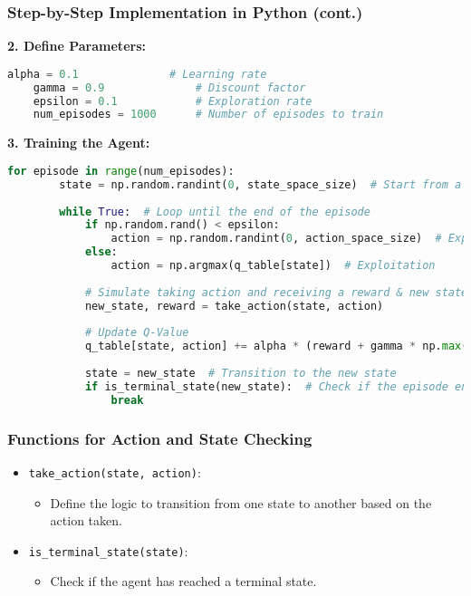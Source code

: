 \documentclass[aspectratio=169]{beamer}
\begin{document}
\begin{frame}[fragile]
    \frametitle{Step-by-Step Implementation in Python (cont.)}
    \textbf{2. Define Parameters:}
    \begin{lstlisting}[language=Python]
    alpha = 0.1              # Learning rate
    gamma = 0.9              # Discount factor
    epsilon = 0.1            # Exploration rate
    num_episodes = 1000      # Number of episodes to train
    \end{lstlisting}

    \textbf{3. Training the Agent:}
    \begin{lstlisting}[language=Python]
    for episode in range(num_episodes):
        state = np.random.randint(0, state_space_size)  # Start from a random state
        
        while True:  # Loop until the end of the episode
            if np.random.rand() < epsilon:
                action = np.random.randint(0, action_space_size)  # Exploration
            else:
                action = np.argmax(q_table[state])  # Exploitation
            
            # Simulate taking action and receiving a reward & new state
            new_state, reward = take_action(state, action)
            
            # Update Q-Value
            q_table[state, action] += alpha * (reward + gamma * np.max(q_table[new_state]) - q_table[state, action])
            
            state = new_state  # Transition to the new state
            if is_terminal_state(new_state):  # Check if the episode ends
                break
    \end{lstlisting}
\end{frame}

\begin{frame}
    \frametitle{Functions for Action and State Checking}
    \begin{itemize}
        \item \texttt{take\_action(state, action)}: 
        \begin{itemize}
            \item Define the logic to transition from one state to another based on the action taken.
        \end{itemize}
        \item \texttt{is\_terminal\_state(state)}: 
        \begin{itemize}
            \item Check if the agent has reached a terminal state.
        \end{itemize}
    \end{itemize}
\end{frame}
\end{document}
